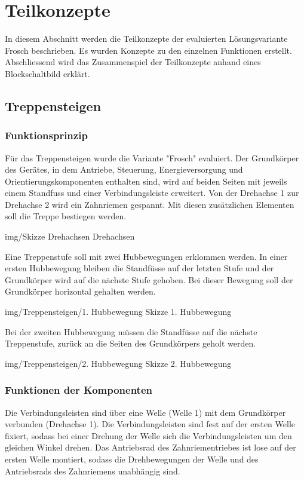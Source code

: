 \section{Teilkonzepte}
In diesem Abschnitt werden die Teilkonzepte der evaluierten Lösungsvariante \glqq Frosch\grqq{} beschrieben. Es wurden Konzepte zu den einzelnen Funktionen erstellt. Abschliessend wird das Zusammenspiel der Teilkonzepte anhand eines Blockschaltbild erklärt.

\subsection{Treppensteigen}

\subsubsection{Funktionsprinzip}
Für das Treppensteigen wurde die Variante "Frosch" evaluiert. Der Grundkörper des Gerätes, in dem Antriebe, Steuerung, Energieversorgung und Orientierungskomponenten enthalten sind, wird auf beiden Seiten mit jeweils einem Standfuss und einer Verbindungsleiste erweitert. Von der Drehachse 1 zur Drehachse 2 wird ein Zahnriemen gespannt. Mit diesen zusätzlichen Elementen soll die Treppe bestiegen werden.

\image
 {img/Skizze Drehachsen}
 {Drehachsen}

Eine Treppenstufe soll mit zwei Hubbewegungen erklommen werden. In einer ersten Hubbewegung bleiben die Standfüsse auf der letzten Stufe und der Grundkörper wird auf die nächste Stufe gehoben. Bei dieser Bewegung soll der Grundkörper horizontal gehalten werden.

\image
 {img/Treppensteigen/1. Hubbewegung Skizze}
 {1. Hubbewegung}

Bei der zweiten Hubbewegung müssen die Standfüsse auf die nächste Treppenstufe, zurück an die Seiten des Grundkörpers geholt werden.

\image
 {img/Treppensteigen/2. Hubbewegung Skizze}
 {2. Hubbewegung}

\subsubsection{Funktionen der Komponenten}
Die Verbindungsleisten sind über eine Welle (Welle 1) mit dem Grundkörper verbunden (Drehachse 1). Die Verbindungsleisten sind fest auf der ersten Welle fixiert, sodass bei einer Drehung der Welle sich die Verbindungsleisten um den gleichen Winkel drehen. Das Antriebsrad des Zahnriementriebes ist lose auf der ersten Welle montiert, sodass die Drehbewegungen der Welle und des Antriebsrads des Zahnriemens unabhängig sind.

